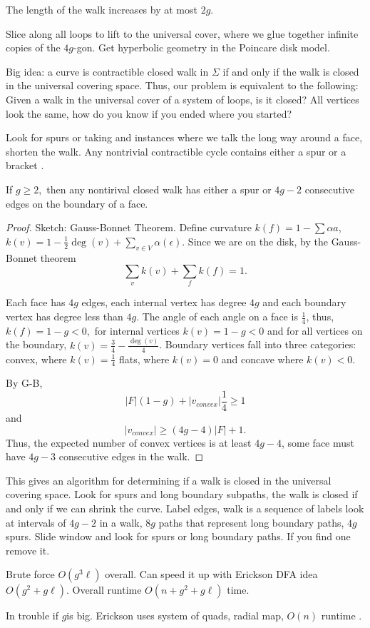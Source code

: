 The length of the walk increases by at most $2g$.

Slice along all loops to lift to the universal cover, where we glue
together infinite copies of the $4g$-gon. Get hyperbolic geometry
in the Poincare disk model. 

Big idea: a curve is contractible closed walk in $\Sigma$
if and only if the walk is closed in the universal covering space.
Thus, our problem is equivalent to the following: Given a walk
in the universal cover of a system of loops, is it closed?
All vertices look the same, how do you know if you ended where
you started?

Look for spurs or taking and instances where we talk the long way around a face, 
shorten the walk.
Any nontrivial contractible cycle contains either a spur or a bracket \cite{gertsen-short-1990}.
\begin{lemma}\label{lem:dehn}
If $g\geq 2,$ then any nontirival closed walk has either a spur
or $4g-2$ consecutive edges on the boundary of a face.
\end{lemma}
\begin{proof}
Sketch: Gauss-Bonnet Theorem.
Define curvature $k(f)=1-\sum \alpha{a}$,
$k(v)=1-\frac{1}{2}\deg(v)+\sum_{v\in V} \alpha(\epsilon)$.
Since we are on the disk, by the Gauss-Bonnet theorem
$$\sum_v k(v)+\sum_f k(f) =1.$$

Each face has $4g$ edges, each internal  vertex has degree $4g$
and each  boundary vertex  has degree less than $4g$.
The angle of each angle on a face  is $\frac{1}{4}$,
thus, $k(f)=1-g<0,$ for internal vertices  $k(v)=1-g<0$ and for all
vertices on the boundary, $k(v)=\frac{3}{4}-\frac{\deg(v)}{4}$.
Boundary vertices fall into three  categories: convex, where $k(v)=\frac{1}{4}$
flats,  where $k(v)=0$  and concave where $k(v)<0$.

By G-B, $$|F|(1-g)+|v_{convex}|\frac{1}{4}\geq 1$$
and 
$$|v_{convex}|\geq (4g-4)|F|+1.$$
Thus, the expected number of convex vertices is at least
$4g-4$, some face must have  $4g-3$ consecutive edges in the walk.
\end{proof}

This gives an algorithm for determining if a walk is closed in the universal
covering space.
Look for spurs and long boundary subpaths, the walk is closed if and  only if
we can  shrink the curve.
Label edges, walk is a sequence of labels
look at intervals of $4g-2$ in a walk, $8g$ paths
that represent long boundary paths, $4g$ spurs.
Slide window and look for spurs or long boundary paths.
If you find one remove it.

Brute force $O(g^3\ell)$ overall.
Can speed it up with Erickson DFA  idea
$O(g^2+g\ell)$.
Overall runtime $O(n+g^2+g\ell)$ time.

In trouble if $g$is big. Erickson uses system of quads,
radial map, $O(n)$ runtime  \cite{erickson-whittlesey-2013}.






